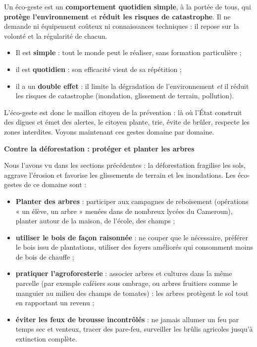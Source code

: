 \documentclass[11pt]{article}
\newcommand{\cle}[1]{{\popxbold\color{popdark}#1}}
\newcounter{popsec}
\newcounter{popsub}
\newcommand{\courssub}[1]{%
  \stepcounter{popsub}%
  \par\vspace{9pt}\noindent{\popxbold\fontsize{11.5}{13}\selectfont\color{popink}{\color{poporange}\thepopsec.\thepopsub}\hspace{6pt}#1}\par\nopagebreak\vspace{4pt}
}
\begin{document}
\begin{definition}
Un \cle{éco-geste} est un \textbf{comportement quotidien simple}, à la portée de tous, qui \textbf{protège l'environnement} et \textbf{réduit les risques de catastrophe}. Il ne demande ni équipement coûteux ni connaissances techniques : il repose sur la volonté et la régularité de chacun.
\end{definition}

\begin{aretenir}
\begin{itemize}
\item Il est \textbf{simple} : tout le monde peut le réaliser, sans formation particulière ;
\item il est \textbf{quotidien} : son efficacité vient de sa répétition ;
\item il a un \textbf{double effet} : il limite la dégradation de l'environnement \emph{et} il réduit les risques de catastrophe (inondation, glissement de terrain, pollution).
\end{itemize}
\end{aretenir}

L'éco-geste est donc le maillon citoyen de la prévention : là où l'État construit des digues et émet des alertes, le citoyen plante, trie, évite de brûler, respecte les zones interdites. Voyons maintenant ces gestes domaine par domaine.

\courssub{Les éco-gestes par domaine d'action}

\textbf{Contre la déforestation : protéger et planter les arbres}\par

Nous l'avons vu dans les sections précédentes : la déforestation fragilise les sols, aggrave l'érosion et favorise les glissements de terrain et les inondations. Les éco-gestes de ce domaine sont :

\begin{itemize}
\item \textbf{Planter des arbres} : participer aux campagnes de reboisement (opérations « un élève, un arbre » menées dans de nombreux lycées du Cameroun), planter autour de la maison, de l'école, des champs ;
\item \textbf{utiliser le bois de façon raisonnée} : ne couper que le nécessaire, préférer le bois issu de plantations, utiliser des foyers améliorés qui consomment moins de bois de chauffe ;
\item \textbf{pratiquer l'agroforesterie} : associer arbres et cultures dans la même parcelle (par exemple caféiers sous ombrage, ou arbres fruitiers comme le manguier au milieu des champs de tomates) : les arbres protègent le sol tout en rapportant un revenu ;
\item \textbf{éviter les feux de brousse incontrôlés} : ne jamais allumer un feu par temps sec et venteux, tracer des pare-feu, surveiller les brûlis agricoles jusqu'à extinction complète.
\end{itemize}
\end{document}
